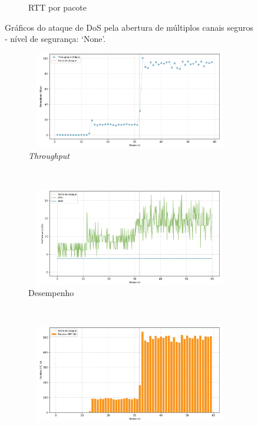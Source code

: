 \begin{apendicesenv}
\begin{figure}[htbp!]
\begin{subfigure}[t]{0.5\textwidth}
        \caption{RTT por pacote}
    \end{subfigure}%
    \label{fig:0-dos_open_multiple_secure_channels}
    \caption{Gráficos do ataque de DoS pela abertura de múltiplos canais seguros - nível de segurança: `None'.}
\end{figure}

\begin{figure}[htbp!]
    \centering
    \begin{subfigure}[t]{0.5\textwidth}
        \centering
        \includegraphics[width=1\textwidth, height=120pt]{USPSC-img/output/cropped/1-dos_open_multiple_secure_channels-tput.png}
        \caption{\textit{Throughput}}
    \end{subfigure}%
    ~ 
    \begin{subfigure}[t]{0.5\textwidth}
        \centering
        \includegraphics[width=1\textwidth, height=120pt]{USPSC-img/output/cropped/1-dos_open_multiple_secure_channels-perf.png}
        \caption{Desempenho}
    \end{subfigure}%
    \\
    \begin{subfigure}[t]{0.5\textwidth}
        \centering
        \includegraphics[width=1\textwidth, height=120pt]{USPSC-img/output/cropped/1-dos_open_multiple_secure_channels-pack.png}

\end{subfigure}
\end{figure}
\end{apendicesenv}
